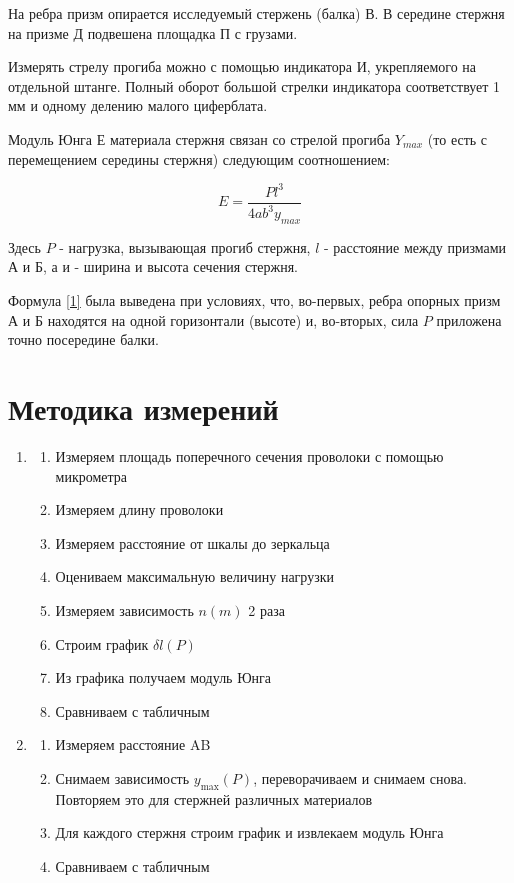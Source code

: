\documentclass[a4paper,12pt]{article} %
\begin{document}
На ребра призм опирается исследуемый стержень (балка) В. В середине стержня на призме Д подвешена площадка П с грузами. 

Измерять стрелу прогиба можно с помощью индикатора И, укрепляемого на отдельной штанге. Полный оборот большой стрелки индикатора соответствует 1 мм и одному делению малого циферблата.

Модуль Юнга Е материала стержня связан со стрелой прогиба $Y_{max}$ (то есть с перемещением середины стержня) следующим соотношением:

\begin{equation} \label{1}
    E = \frac {Pl^3}{4ab^3y_{max}}
\end{equation}

Здесь $ P $  - нагрузка, вызывающая прогиб стержня, $ l $  - расстояние между призмами А и Б, а и - ширина и высота сечения стержня.

Формула \eqref{1} была выведена при условиях, что, во-первых, ребра опорных призм А и Б находятся на одной горизонтали (высоте) и, во-вторых, сила $ P $  приложена точно посередине балки.

\section{Методика измерений}
\begin{enumerate}
    \item \begin{enumerate}
        \item Измеряем площадь поперечного сечения проволоки с помощью микрометра
        \item Измеряем длину проволоки 
        \item Измеряем расстояние от шкалы до зеркальца
        \item Оцениваем максимальную величину нагрузки
        \item Измеряем зависимость $ n(m) $ 2 раза
        \item Строим график $\delta l (P)$
        \item  Из графика получаем модуль Юнга
        \item Сравниваем с табличным
    \end{enumerate}
    \item \begin{enumerate}
        \item Измеряем расстояние AB
        \item Снимаем зависимость $ y_{\max}(P)$, переворачиваем и снимаем снова. Повторяем это для стержней различных материалов
        \item Для каждого стержня строим график и извлекаем модуль Юнга
        \item Сравниваем с табличным
    \end{enumerate}
\end{enumerate}
\end{document}

